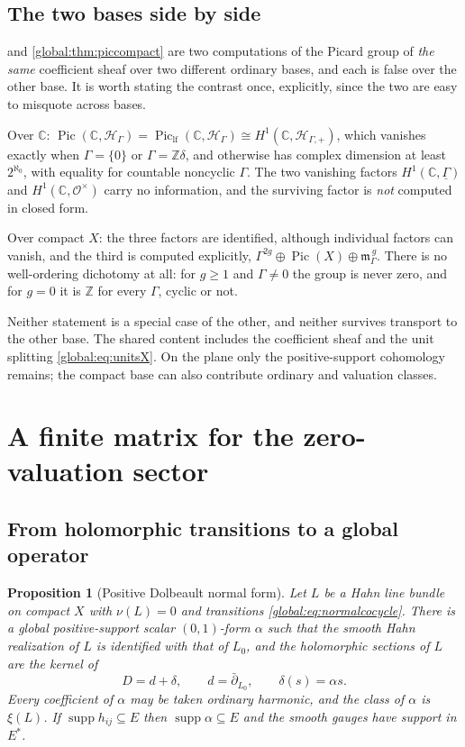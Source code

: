 \documentclass[11pt,letterpaper]{article}
\newtheorem{proposition}[proposition]{Proposition}
\theoremstyle{definition}
\theoremstyle{remark}
\newcommand{\C}{\mathbb C}
\newcommand{\Z}{\mathbb Z}
\newcommand{\OO}{\mathcal O}
\newcommand{\HH}{\mathscr H_\Gamma}
\newcommand{\HP}{\mathscr H_{\Gamma,+}}
\newcommand{\mK}{\mathfrak m_\Gamma}
\newcommand{\supp}{\operatorname{supp}}
\newcommand{\Pic}{\operatorname{Pic}}
\newcommand{\Piclf}{\operatorname{Pic}_{\mathrm{lf}}}
\numberwithin{equation}{section}
\begin{document}
\subsection{The two bases side by side}\label{global:sub:twohalves}

 and \cref{global:thm:piccompact} are two computations of the Picard group of \emph{the same} coefficient sheaf over two different ordinary bases, and each is false over the other base. It is worth stating the contrast once, explicitly, since the two are easy to misquote across bases.

Over $\C$: $\Pic(\C,\HH)=\Piclf(\C,\HH)\cong H^1(\C,\HP)$, which vanishes exactly when $\Gamma=\{0\}$ or $\Gamma=\Z\delta$, and otherwise has complex dimension at least $2^{\aleph_0}$, with equality for countable noncyclic $\Gamma$. The two vanishing factors $H^1(\C,\underline\Gamma)$ and $H^1(\C,\OO^\times)$ carry no information, and the surviving factor is \emph{not} computed in closed form.

Over compact $X$: the three factors are identified, although individual factors can vanish, and the third is computed explicitly, $\Gamma^{2g}\oplus\Pic(X)\oplus\mK^{\,g}$. There is no well-ordering dichotomy at all: for $g\ge1$ and $\Gamma\ne0$ the group is never zero, and for $g=0$ it is $\Z$ for every $\Gamma$, cyclic or not.

Neither statement is a special case of the other, and neither survives transport to the other base. The shared content includes the coefficient sheaf and the unit splitting \eqref{global:eq:unitsX}. On the plane only the positive-support cohomology remains; the compact base can also contribute ordinary and valuation classes.

\section{A finite matrix for the zero-valuation sector}\label{global:sec:finitematrix}

\subsection{From holomorphic transitions to a global operator}

\begin{proposition}[Positive Dolbeault normal form]\label{global:prop:normalform}
Let $L$ be a Hahn line bundle on compact $X$ with $\nu(L)=0$ and transitions \eqref{global:eq:normalcocycle}. There is a global positive-support scalar $(0,1)$-form $\alpha$ such that the smooth Hahn realization of $L$ is identified with that of $L_0$, and the holomorphic sections of $L$ are the kernel of
\begin{equation}\label{global:eq:D}
  D=d+\delta,\qquad d=\bar\partial_{L_0},\qquad \delta(s)=\alpha s .
\end{equation}
Every coefficient of $\alpha$ may be taken ordinary harmonic, and the class of $\alpha$ is $\xi(L)$. If $\supp h_{ij}\subseteq E$ then $\supp\alpha\subseteq E$ and the smooth gauges have support in $E^*$.
\end{proposition}
\end{document}
